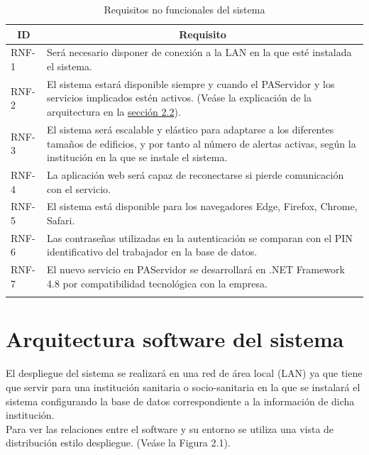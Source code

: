\begin{longtable}{|p{}|p{}|}
	\hline
	\multicolumn{1}{|c|}{\centering \textbf{ID}} & \multicolumn{1}{c|}{\centering \textbf{Requisito}} \\
	\hline
	RNF-1 	& 	Será necesario disponer de conexión a la LAN en la que esté instalada el sistema. \\
	\hline
	RNF-2	&	El sistema estará disponible siempre y cuando el PAServidor y los servicios implicados estén activos. (Veáse la explicación de la arquitectura en la \hyperref[section-arquitectura]{sección 2.2}).	\\
	\hline
	RNF-3	&	El sistema será escalable y elástico para adaptarse a los diferentes tamaños de edificios, y por tanto al número de alertas activas, según la institución en la que se instale el sistema.\\
	\hline
	RNF-4	&	La aplicación web será capaz de reconectarse si pierde comunicación con el servicio.\\
	\hline
	RNF-5	&	El sistema está disponible para los navegadores Edge, Firefox, Chrome, Safari.\\
	\hline
	RNF-6	&	Las contraseñas utilizadas en la autenticación se comparan con el PIN identificativo del trabajador en la base de datos. \\
	\hline
	RNF-7	&	El nuevo servicio en PAServidor se desarrollará en .NET Framework 4.8 por compatibilidad tecnológica con la empresa. \\
	\hline
\caption{Requisitos no funcionales del sistema}
\label{tab:RNF}
\end{longtable}


\section{Arquitectura software del sistema}
\label{section-arquitectura}

El despliegue del sistema se realizará en una red de área local (LAN) ya que tiene que servir para una institución sanitaria o socio-sanitaria en la que se instalará el sistema configurando la base de datos correspondiente a la información de dicha institución.\\

Para ver las relaciones entre el software y su entorno se utiliza una vista de distribución estilo despliegue. (Veáse la Figura 2.1). \\

